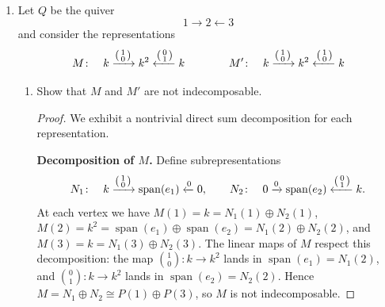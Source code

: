 \documentclass[11pt, a4paper]{article}
\begin{document}
\begin{enumerate}[leftmargin=*, label=\textbf{\arabic*.}]
\item Let $Q$ be the quiver
\[
1 \xrightarrow{\quad} 2 \xleftarrow{\quad} 3
\]
and consider the representations
\[
M\colon\quad k \xrightarrow{\begin{psmallmatrix} 1 \\ 0 \end{psmallmatrix}} k^2 \xleftarrow{\begin{psmallmatrix} 0 \\ 1 \end{psmallmatrix}} k
\qquad\qquad
M'\colon\quad k \xrightarrow{\begin{psmallmatrix} 1 \\ 0 \end{psmallmatrix}} k^2 \xleftarrow{\begin{psmallmatrix} 1 \\ 0 \end{psmallmatrix}} k
\]
\begin{enumerate}[label=(\alph*)]
    \item Show that $M$ and $M'$ are not indecomposable.
    \begin{proof}
    We exhibit a nontrivial direct sum decomposition for each representation.

    \medskip\noindent\textbf{Decomposition of $M$.}
    Define subrepresentations
    \[
    N_1\colon\quad k \xrightarrow{\begin{psmallmatrix} 1 \\ 0 \end{psmallmatrix}} \operatorname{span}(e_1) \xleftarrow{0} 0,
    \qquad
    N_2\colon\quad 0 \xrightarrow{0} \operatorname{span}(e_2) \xleftarrow{\begin{psmallmatrix} 0 \\ 1 \end{psmallmatrix}} k.
    \]
    At each vertex we have $M(1) = k = N_1(1) \oplus N_2(1)$, $M(2) = k^2 = \operatorname{span}(e_1) \oplus \operatorname{span}(e_2) = N_1(2) \oplus N_2(2)$, and $M(3) = k = N_1(3) \oplus N_2(3)$.
    The linear maps of $M$ respect this decomposition: the map $\binom{1}{0}\colon k \to k^2$ lands in $\operatorname{span}(e_1) = N_1(2)$, and $\binom{0}{1}\colon k \to k^2$ lands in $\operatorname{span}(e_2) = N_2(2)$.
    Hence $M = N_1 \oplus N_2 \cong P(1) \oplus P(3)$, so $M$ is not indecomposable.


\end{proof}
\end{enumerate}
\end{enumerate}
\end{document}
